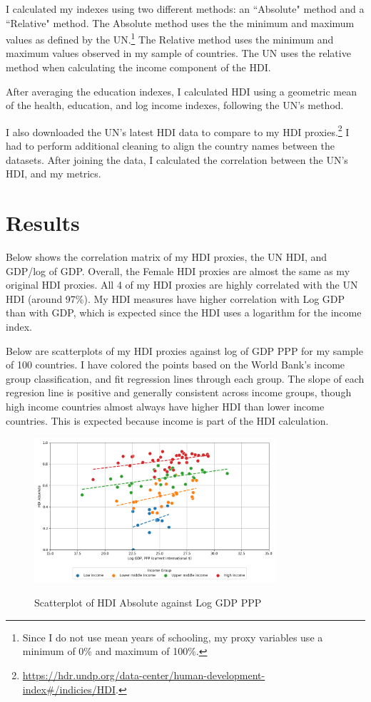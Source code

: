 \documentclass[12pt]{article}
\begin{document}
I calculated my indexes using two different methods: an ``Absolute" method and a ``Relative" method. The Absolute method uses the the minimum and maximum values as defined by the UN.\footnote{Since I do not use mean years of schooling, my proxy variables use a minimum of 0\% and maximum of 100\%.} The Relative method uses the minimum and maximum values observed in my sample of countries. The UN uses the relative method when calculating the income component of the HDI.

After averaging the education indexes, I calculated HDI using a geometric mean of the health, education, and log income indexes, following the UN's method.

I also downloaded the UN's latest HDI data to compare to my HDI proxies.\footnote{\url{https://hdr.undp.org/data-center/human-development-index\#/indicies/HDI}.} I had to perform additional cleaning to align the country names between the datasets. After joining the data, I calculated the correlation between the UN's HDI, and my metrics.

\section{Results}
Below shows the correlation matrix of my HDI proxies, the UN HDI, and GDP/log of GDP. Overall, the Female HDI proxies are almost the same as my original HDI proxies. All 4 of my HDI proxies are highly correlated with the UN HDI (around 97\%). My HDI measures have higher correlation with Log GDP than with GDP, which is expected since the HDI uses a logarithm for the income index.



Below are scatterplots of my HDI proxies against log of GDP PPP for my sample of 100 countries. I have colored the points based on the World Bank's income group classification, and fit regression lines through each group. The slope of each regresion line is positive and generally consistent across income groups, though high income countries almost always have higher HDI than lower income countries. This is expected because income is part of the HDI calculation.

\begin{figure}[H]
\centering
\caption{Scatterplot of HDI Absolute against Log GDP PPP}
\includegraphics[width=0.8\textwidth]{./output/Scatterplot HDI Absolute.png}
\label{fig:scatter_hdi_absolute}
\end{figure}
\end{document}
